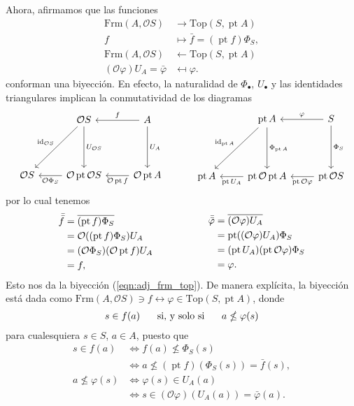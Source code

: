 \documentclass[12pt,letterpaper,titlepage]{article}
\theoremstyle{definition}
\newcommand\ol[1]{\overline{#1}}
\renewcommand\phi{\varphi}
\renewcommand\cal[1]{\mathcal{#1}}
\newcommand\ssi{\hspace{5mm}\text{ si, y solo si }\hspace{5mm}}
\newcommand\<{\langle}
\renewcommand\>{\rangle}
\newcommand{\Frm}{\mathrm{Frm}}
\newcommand{\Top}{\mathrm{Top}}
\newcommand{\id}{\mathrm{id}}
\DeclareMathOperator{\pt}{pt}
\begin{document}
Ahora, afirmamos que las funciones
\begin{align*}
    \Frm(A,\cal OS) &\to \Top(S,\pt A) \\
    f &\mapsto \bar f = (\pt f)\Phi_S,
    \\
    \Frm(A,\cal OS) &\leftarrow \Top(S,\pt A) \\
    (\cal O\phi)U_A = \bar\phi &\mapsfrom \phi.
\end{align*}
conforman una biyección.
En efecto,
la naturalidad de $\Phi_\bullet$, $U_\bullet$ y las identidades
triangulares implican la conmutatividad de los diagramas
\[
    \begin{tikzcd}[row sep=15mm]
        & \cal OS \ar[d,"U_{\cal OS}"] \ar[dl,"\id_{\cal OS}"']
        & A \ar[l,"f"'] \ar[d,"U_A"]
        \\
        \cal OS
        & \cal O\pt\cal OS \ar[l,"\cal O\Phi_S"]
        & \cal O\pt A \ar[l,"\cal O\pt f"]
    \end{tikzcd}
    \hspace{10mm}
    \begin{tikzcd}[row sep=15mm]
        & \pt A \ar[d,"\Phi_{\pt A}"] \ar[dl,"\id_{\pt A}"']
        & S \ar[l,"\phi"'] \ar[d,"\Phi_S"]
        \\
        \pt A
        & \pt \cal O\pt A \ar[l,"\pt U_A"]
        & \pt \cal OS \ar[l,"\pt\cal O\phi"]
    \end{tikzcd}
\]
por lo cual tenemos
\[
    \begin{aligned}
        \bar{\bar f}
        &= \ol{(\pt f)\Phi_S} \\
        &= \cal O((\pt f)\Phi_S)U_A \\
        &= (\cal O\Phi_S)(\cal O\pt f)U_A \\
        &= f,
    \end{aligned}
    \hspace{20mm}
    \begin{aligned}
        \bar{\bar\phi}
        &= \ol{(\cal O\phi)U_A} \\
        &= \pt((\cal O\phi)U_A)\Phi_S \\
        &= (\pt U_A)(\pt\cal O\phi)\Phi_S \\
        &= \phi.
    \end{aligned}
\]
Esto nos da la biyección (\ref{eqn:adj_frm_top}).
De manera explícita, la biyección está dada como
$\Frm(A,\cal OS)\ni f\leftrightarrow \phi\in \Top(S,\pt A)$, donde
\[
    s\in f(a) \ssi a\nleq \phi(s)
\]
para cualesquiera $s\in S$, $a\in A$, puesto que
\begin{align*}
    s\in f(a)
    &\iff f(a)\nleq \Phi_S(s) \\
    &\iff a \nleq (\pt f)(\Phi_S(s))=\bar f(s),
    \\
    a\nleq \phi(s)
    &\iff \phi(s) \in U_A(a) \\
    &\iff s \in (\cal O\phi)(U_A(a)) = \bar\phi(a).
\end{align*}
\end{document}

